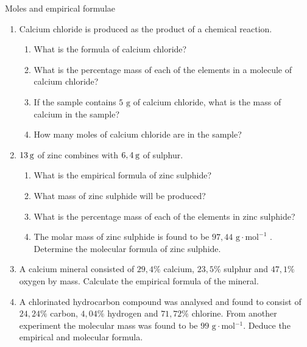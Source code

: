             \begin{exercises}{Moles and empirical formulae
      }
            \nopagebreak \noindent \vspace{-2cm}
      \label{m38712*id281924}\begin{enumerate}[noitemsep, label=\textbf{\arabic*}. ] 
            \label{m38712*uid73}\item Calcium chloride is produced as the product of a chemical reaction.
\label{m38712*id281940}\begin{enumerate}[noitemsep, label=\textbf{\alph*}. ] 
            \label{m38712*uid74}\item What is the formula of calcium chloride?
\label{m38712*uid75}\item What is the percentage mass of each of the elements in a molecule of calcium chloride?
\label{m38712*uid76}\item If the sample contains $5 \text{ g}$ of calcium chloride, what is the mass of calcium in the sample?
\label{m38712*uid77}\item How many moles of calcium chloride are in the sample?
\end{enumerate}
                \label{m38712*uid78}\item $13\phantom{\rule{2pt}{0ex}}\text{g}$ of zinc combines with $6,4\phantom{\rule{2pt}{0ex}}\text{g}$ of sulphur.
\label{m38712*id282007}\begin{enumerate}[noitemsep, label=\textbf{\alph*}. ] 
\item  What is the empirical formula of zinc sulphide?
            \label{m38712*uid79}\item What mass of zinc sulphide will be produced?
\label{m38712*uid80}\item What is the percentage mass of each of the elements in zinc sulphide?
\label{m38712*uid81}\item The molar mass of zinc sulphide is found to be $97,44 \text{ g} \cdot \text{mol}^{−1}$ . Determine the molecular formula of zinc sulphide.
\end{enumerate}
                \label{m38712*uid82}\item A calcium mineral consisted of $29,4\%$ calcium, $23,5\%$ sulphur and $47,1\%$ oxygen by mass. Calculate the empirical formula of the mineral.\newline
\label{m38712*uid83}\item A chlorinated hydrocarbon compound was analysed and found to consist of $24,24\%$ carbon, $4,04\%$ hydrogen and $71,72\%$ chlorine. From another experiment the molecular mass was found to be $99\text{ g} \cdot \text{mol}{}^{-1}$. Deduce the empirical and molecular formula.\newline

\end{enumerate}
\end{exercises}
